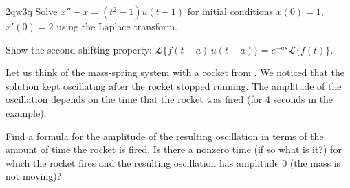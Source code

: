 \begin{exercise}2qw3q
	Solve $x''-x = (t^2-1) u(t-1)$ for initial conditions $x(0)=1$, $x'(0) = 2$
	using the Laplace transform.
\end{exercise}

\begin{exercise}
Show the second shifting property: 
$\mathcal{L} \bigl\{ f(t-a) \, u(t-a) \bigr\}
= e^{-as} \mathcal{L} \bigl\{ f(t) \bigr\}$.
\end{exercise}

\begin{exercise}
Let us think of the mass-spring system with a rocket from
.  We noticed that the solution kept oscillating
after the rocket stopped running.  The amplitude of the oscillation depends
on the time that the rocket was fired (for 4 seconds in the example).
\begin{tasks}
\task
Find a formula for the amplitude of the resulting oscillation
in terms of the amount of time the rocket is fired.
\task
 Is there
a nonzero time (if so what is it?)
for which the rocket fires and the resulting oscillation
has amplitude 0 (the mass is not moving)?
\end{tasks}
\end{exercise}

